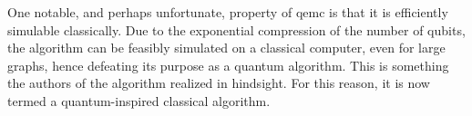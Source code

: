 One notable, and perhaps unfortunate, property of \acrshort{qemc} is that it is efficiently simulable classically. Due to the exponential compression of the number of qubits, the algorithm can be feasibly simulated on a classical computer, even for large graphs, hence defeating its purpose as a quantum algorithm. This is something the authors of the algorithm \cite{tenecohen2023variational} realized in hindsight. For this reason, it is now termed a quantum-inspired classical algorithm.









